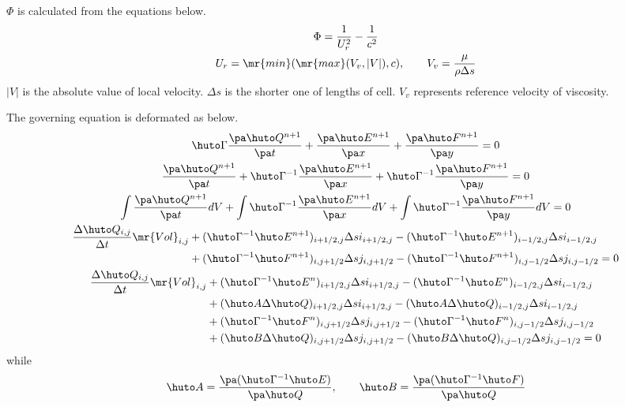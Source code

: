 \documentclass{jsarticle}
\newcommand{\bQ}{\huto Q}
\newcommand{\bE}{\huto E}
\newcommand{\bF}{\huto F}
\newcommand{\bA}{\huto A}
\newcommand{\bB}{\huto B}
\newcommand{\bG}{\huto \Gamma}
\newcommand{\Vol}{\mr{Vol}}
\begin{document}
$\Phi$ is calculated from the equations below.
\begin{gather}
\Phi = \frac{1}{U_r^2}-\frac 1 {c^2}\\
U_r = \mr{min}(\mr{max}(V_v,|V|),c), \hspace{2em}V_v = \frac{\mu}{\rho \Delta s}
\end{gather}
$|V|$ is the absolute value of local velocity. $\Delta s$ is the shorter one of lengths of cell. $V_v$ represents reference velocity of viscosity.

The governing equation is deformated as below.
\begin{gather}
\bG \frac{\pa \bQ^{n+1}}{\pa t} + \frac{\pa \bE^{n+1}}{\pa x} + \frac{\pa \bF^{n+1}}{\pa y} = 0\\
\frac{\pa \bQ^{n+1}}{\pa t} + \bG ^{-1} \frac{\pa \bE^{n+1}}{\pa x} + \bG ^{-1} \frac{\pa \bF^{n+1}}{\pa y} = 0\\
\int \frac{\pa \bQ^{n+1}}{\pa t} dV + \int \bG ^{-1} \frac{\pa \bE^{n+1}}{\pa x} dV + \int \bG ^{-1} \frac{\pa \bF^{n+1}}{\pa y} dV = 0\\
\begin{split}
\frac{\Delta \bQ _{i,j}}{\Delta t} \Vol _{i,j}
&+ (\bG ^{-1} \bE^{n+1})_{i+1/2,j}\Delta si_{i+1/2,j} - (\bG ^{-1} \bE^{n+1})_{i-1/2,j}\Delta si_{i-1/2,j}\\
&+ (\bG ^{-1} \bF^{n+1})_{i,j+1/2}\Delta sj_{i,j+1/2} - (\bG ^{-1} \bF^{n+1})_{i,j-1/2}\Delta sj_{i,j-1/2}=0\\
\end{split}\\
\begin{split}
\frac{\Delta \bQ _{i,j}}{\Delta t} \Vol _{i,j}
&+ (\bG ^{-1} \bE^n)_{i+1/2,j}\Delta si_{i+1/2,j} - (\bG ^{-1} \bE^n)_{i-1/2,j}\Delta si_{i-1/2,j}\\
&+ (\bA\Delta \bQ)_{i+1/2,j}\Delta si_{i+1/2,j} - (\bA\Delta \bQ)_{i-1/2,j}\Delta si_{i-1/2,j}\\
&+ (\bG ^{-1} \bF^n)_{i,j+1/2}\Delta sj_{i,j+1/2} - (\bG ^{-1} \bF^n)_{i,j-1/2}\Delta sj_{i,j-1/2}\\
&+ (\bB\Delta \bQ)_{i,j+1/2}\Delta sj_{i,j+1/2} - (\bB\Delta \bQ)_{i,j-1/2}\Delta sj_{i,j-1/2}=0\\
\end{split} \label{before_pm}
\end{gather}
while
\begin{equation}
\bA = \frac{\pa (\bG ^{-1}\bE)}{\pa \bQ},\hspace{2em}\bB = \frac{\pa (\bG ^{-1}\bF)}{\pa \bQ}
\end{equation}
\end{document}
